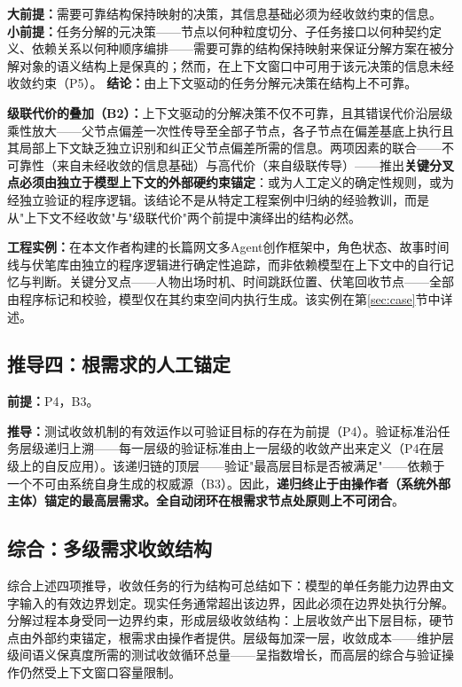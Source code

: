 \documentclass[11pt,a4paper]{article}
\theoremstyle{definition}
\begin{document}
\textbf{大前提：}需要可靠结构保持映射的决策，其信息基础必须为经收敛约束的信息。
\textbf{小前提：}任务分解的元决策——节点以何种粒度切分、子任务接口以何种契约定义、依赖关系以何种顺序编排——需要可靠的结构保持映射来保证分解方案在被分解对象的语义结构上是保真的；然而，在上下文窗口中可用于该元决策的信息未经收敛约束（P5）。
\textbf{结论：}由上下文驱动的任务分解元决策在结构上不可靠。

\textbf{级联代价的叠加（B2）：}上下文驱动的分解决策不仅不可靠，且其错误代价沿层级乘性放大——父节点偏差一次性传导至全部子节点，各子节点在偏差基底上执行且其局部上下文缺乏独立识别和纠正父节点偏差所需的信息。两项因素的联合——不可靠性（来自未经收敛的信息基础）与高代价（来自级联传导）——推出\textbf{关键分叉点必须由独立于模型上下文的外部硬约束锚定}：或为人工定义的确定性规则，或为经独立验证的程序逻辑。该结论不是从特定工程案例中归纳的经验教训，而是从"上下文不经收敛"与"级联代价"两个前提中演绎出的结构必然。

\textbf{工程实例：}在本文作者构建的长篇网文多Agent创作框架中，角色状态、故事时间线与伏笔库由独立的程序逻辑进行确定性追踪，而非依赖模型在上下文中的自行记忆与判断。关键分叉点——人物出场时机、时间跳跃位置、伏笔回收节点——全部由程序标记和校验，模型仅在其约束空间内执行生成。该实例在第\ref{sec:case}节中详述。

\subsection{推导四：根需求的人工锚定}

\textbf{前提：}P4，B3。

\textbf{推导：}测试收敛机制的有效运作以可验证目标的存在为前提（P4）。验证标准沿任务层级递归上溯——每一层级的验证标准由上一层级的收敛产出来定义（P4在层级上的自反应用）。该递归链的顶层——验证"最高层目标是否被满足"——依赖于一个不可由系统自身生成的权威源（B3）。因此，\textbf{递归终止于由操作者（系统外部主体）锚定的最高层需求。全自动闭环在根需求节点处原则上不可闭合}。

\subsection{综合：多级需求收敛结构}

综合上述四项推导，收敛任务的行为结构可总结如下：模型的单任务能力边界由文字输入的有效边界划定。现实任务通常超出该边界，因此必须在边界处执行分解。分解过程本身受同一边界约束，形成层级收敛结构：上层收敛产出下层目标，硬节点由外部约束锚定，根需求由操作者提供。层级每加深一层，收敛成本——维护层级间语义保真度所需的测试收敛循环总量——呈指数增长，而高层的综合与验证操作仍然受上下文窗口容量限制。
\end{document}

